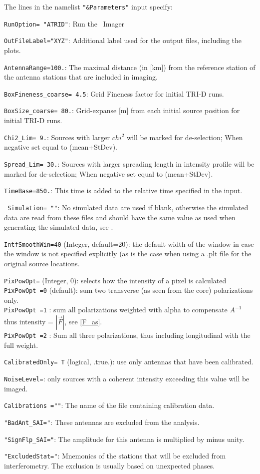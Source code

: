 The lines in the namelist \verb!"&Parameters"! input specify:
\begin{enumerate*}
\item \verb!RunOption= "ATRID"!: Run the \ATRID\ Imager
\item \verb!OutFileLabel="XYZ"!: Additional label used for the output files, including the plots.
\item \verb!AntennaRange=100.!: The maximal distance (in [km]) from the reference station of the antenna stations that are included in imaging.
\item \verb!BoxFineness_coarse= 4.5!:  Grid Fineness factor for initial TRI-D runs.
\item \verb!BoxSize_coarse= 80.!:  Grid-expanse [m] from each initial source position for initial TRI-D runs.
\item \verb!Chi2_Lim= 9.!:  Sources with larger $chi^2$ will be marked for de-selection; When negative set equal to (mean+StDev).
\item \verb!Spread_Lim= 30.!:  Sources with larger spreading length in intensity profile will be marked for de-selection; When negative set equal to (mean+StDev).
\item \verb!TimeBase=850.!: This time is added to the relative time specified in the input.
\item \verb# Simulation= ""#: No simulated data are used if blank, otherwise the simulated data are read from these files and should have the same value as used when generating the simulated data, see .
\item \verb!IntfSmoothWin=40! (Integer, default=20): the default width of the window in case the window is not specified explicitly (as is the case when using a .plt file for the original source locations.
\item \verb!PixPowOpt=! (Integer, 0): selects how the intensity of a pixel is calculated
   \\\verb!PixPowOpt =0! (default): sum two transverse (as seen from the core) polarizations only.
   \\\verb!PixPowOpt =1! : sum all polarizations weighted with alpha to compensate $A^{-1}$ thus intensity =  $|\vec{F}|$, see \eqref{F_as}.
   \\\verb!PixPowOpt =2! : Sum all three polarizations, thus including longitudinal with the full weight.
\item \verb!CalibratedOnly= T! (logical, .true.): use only antennas that have been calibrated.
\item \verb!NoiseLevel=!: only sources with a coherent intensity exceeding this value will be imaged.
\item \verb!Calibrations =""!: The name of the file containing calibration data.
\item \verb!"BadAnt_SAI="!: These antennas are excluded from the analysis.
\item \verb!"SignFlp_SAI="!: The amplitude for this antenna is multiplied by minus unity.
\item \verb!"ExcludedStat="!: Mnemonics of the stations that will be excluded from interferometry. The exclusion is usually based on unexpected phases.
\end{enumerate*}

